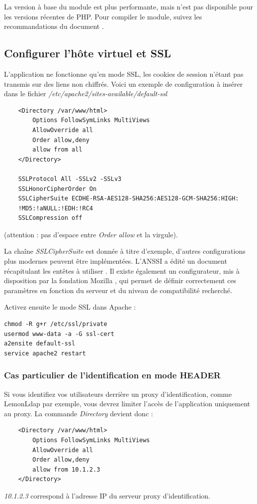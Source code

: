 La version à base du module est plus performante, mais n'est pas disponible pour les versions récentes de PHP. 
Pour compiler le module, suivez les recommandations du document \cite{clamaveq}.

\subsection{Configurer l'hôte virtuel et SSL}
L'application ne fonctionne qu'en mode SSL, les cookies de session n'étant pas transmis sur des liens non chiffrés. Voici un exemple de configuration à insérer dans le fichier \textit{/etc/apache2/sites-available/default-ssl}
\begin{lstlisting}
    <Directory /var/www/html>
        Options FollowSymLinks MultiViews
        AllowOverride all
        Order allow,deny
        allow from all
    </Directory>

    SSLProtocol All -SSLv2 -SSLv3
    SSLHonorCipherOrder On
    SSLCipherSuite ECDHE-RSA-AES128-SHA256:AES128-GCM-SHA256:HIGH:
    !MD5:!aNULL:!EDH:!RC4
    SSLCompression off
\end{lstlisting}

(attention : pas d'espace entre \textit{Order allow} et la virgule).

La chaîne \textit{SSLCipherSuite} est donnée à titre d'exemple, d'autres configurations plus modernes peuvent être implémentées. L'ANSSI a édité un document récapitulant les entêtes à utiliser \cite{tls}. Il existe également un configurateur, mis à disposition par la fondation Mozilla \cite{mozillagenerator}, qui permet de définir correctement ces paramètres en fonction du serveur et du niveau de compatibilité recherché. 

Activez ensuite le mode SSL dans Apache :
\begin{lstlisting}
chmod -R g+r /etc/ssl/private
usermod www-data -a -G ssl-cert
a2ensite default-ssl
service apache2 restart
\end{lstlisting}

\subsubsection{Cas particulier de l'identification en mode HEADER}

Si vous identifiez vos utilisateurs derrière un proxy d'identification, comme LemonLdap par exemple, vous devrez limiter l'accès de l'application uniquement au proxy. La commande \textit{Directory} devient donc :
\begin{lstlisting}
    <Directory /var/www/html>
        Options FollowSymLinks MultiViews
        AllowOverride all
        Order allow,deny
        allow from 10.1.2.3
    </Directory>

\end{lstlisting}
\textit{10.1.2.3} correspond à l'adresse IP du serveur proxy d'identification.

